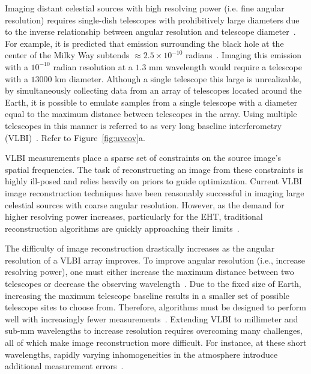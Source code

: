 Imaging distant celestial sources with high resolving power (i.e. fine angular resolution) requires single-dish telescopes with prohibitively large diameters due to the inverse relationship between angular resolution and telescope diameter~\cite{thompson2008interferometry}.
For example, it is predicted that emission surrounding the black hole at the center of the Milky Way subtends $\approx 2.5\times 10^{-10}$ radians~\cite{fish2014imaging}. Imaging this emission with a $10^{-10}$ radian resolution at a $1.3$ mm wavelength would require a telescope with a $13000$ km diameter. 
Although a single telescope this large is unrealizable, by simultaneously collecting data from an array of telescopes located around the Earth, it is possible to emulate samples from a single telescope with a diameter equal to the maximum distance between telescopes in the array. Using multiple telescopes in this manner is referred to as very long baseline interferometry (VLBI)~\cite{thompson2008interferometry}.  
Refer to Figure~\ref{fig:uvcov}a.


VLBI measurements place a sparse set of constraints on the source image's spatial frequencies. 
The task of reconstructing an image from these constraints is highly ill-posed and relies heavily on priors to guide optimization. 
Current VLBI image reconstruction techniques have been reasonably successful in imaging large celestial sources with coarse angular resolution. 
However, as the demand for higher resolving power increases, particularly for the EHT, traditional reconstruction algorithms are quickly approaching their limits~\cite{rusenimaging, taylor1999synthesis}. 


The difficulty of image reconstruction drastically increases as the angular resolution of a VLBI array improves. 
To improve angular resolution (i.e., increase resolving power), one must either increase the maximum distance between two telescopes or decrease the observing wavelength~\cite{thompson2008interferometry}. 
Due to the fixed size of Earth, increasing the maximum telescope baseline results in a smaller set of possible telescope sites to choose from.
Therefore, algorithms must be designed to perform well with increasingly fewer measurements~\cite{rusenimaging}.
Extending VLBI to millimeter and sub-mm wavelengths to increase resolution requires overcoming many challenges, all of which make image reconstruction more difficult.
For instance, at these short wavelengths, 
rapidly varying inhomogeneities in the atmosphere introduce additional measurement errors~\cite{monnier2013radio, taylor1999synthesis}.

